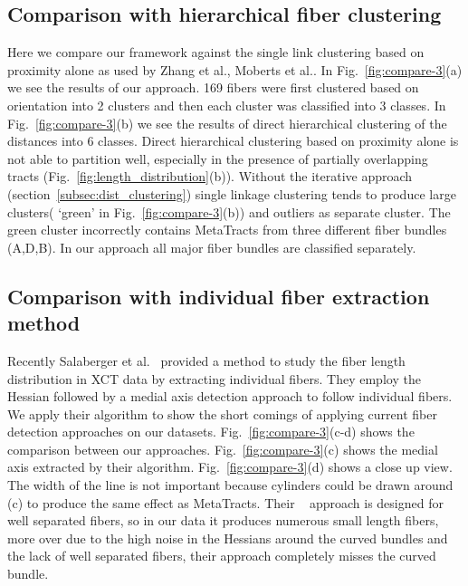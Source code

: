 \subsection {Comparison with hierarchical fiber clustering}
\label{subsec:compare}
Here we compare our framework against the single link clustering based on proximity alone as used by Zhang et al.\cite{Zhang2008}, Moberts et al.\cite{Moberts2005}. In Fig.~\ref{fig:compare-3}(a) we see the results of our approach. 169 fibers were first clustered based on orientation into 2 clusters and then each cluster was classified into 3 classes. In Fig.~\ref{fig:compare-3}(b) we see the results of direct hierarchical clustering of the distances into 6 classes. Direct hierarchical clustering based on proximity alone is not able to partition well, especially in the presence of partially overlapping tracts (Fig.~\ref{fig:length_distribution}(b)). Without the iterative approach (section~\ref{subsec:dist_clustering}) single linkage clustering tends to produce large clusters( `green' in Fig.~\ref{fig:compare-3}(b)) and outliers as separate cluster. The green cluster incorrectly contains MetaTracts from three different fiber bundles (A,D,B). In our approach all major fiber bundles are classified separately.
\subsection{Comparison with individual fiber extraction method}
 Recently  Salaberger et al.~\cite{Salaberger2011} provided a method to study the fiber length distribution in XCT data by extracting individual fibers. They employ the Hessian followed by a medial axis detection approach to follow  individual fibers. We apply their algorithm to show the short comings of applying current fiber detection approaches on our datasets. Fig.~\ref{fig:compare-3}(c-d) shows the comparison between our approaches. Fig.~\ref{fig:compare-3}(c) shows the medial axis extracted by their algorithm. Fig.~\ref{fig:compare-3}(d) shows a close up view. The width of the line is not important because cylinders could be drawn around (c) to produce the same effect as MetaTracts. Their ~\cite{Salaberger2011} approach is designed for well separated fibers, so in our data it produces numerous small length fibers, more over due to the high noise in the Hessians around the curved bundles and the lack of well separated fibers, their approach completely misses the curved bundle.
 
 
